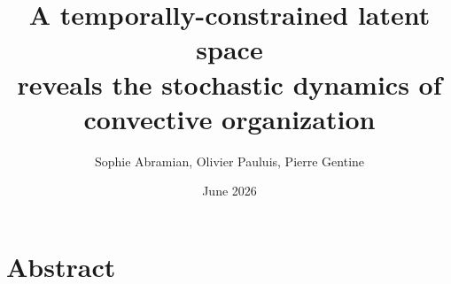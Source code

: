\documentclass[11pt]{article}
\title{A temporally-constrained latent space \\ reveals the stochastic dynamics of convective organization}
\author{Sophie Abramian, Olivier Pauluis, Pierre Gentine}
\date{June 2026}
\begin{document}
\maketitle


\section*{Abstract}
\end{document}

